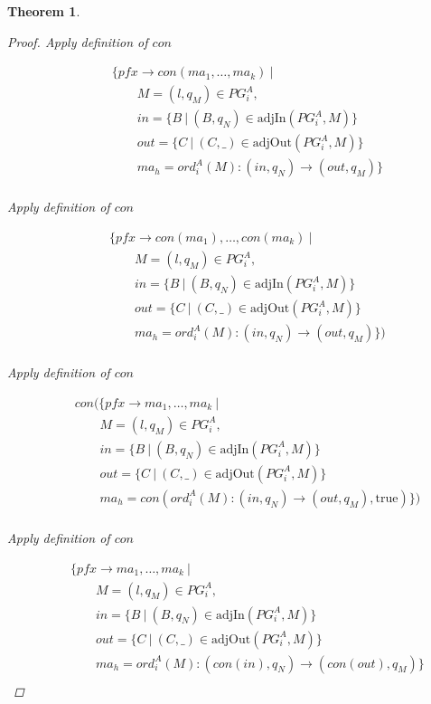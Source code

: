 \documentclass[twocolumn]{sig-alternate-10pt}
\newtheorem{thm}{Theorem}[section]
\begin{document}
\begin{thm}
\begin{proof}
  Apply definition of $con$

  \[ \begin{array}{l}
     ~~~~~~~~~ \{ pfx \rightarrow con(ma_1, \dots, ma_k) ~\vert~ \\
     ~~~~~~~~~~~~~~~~~~ M = (l,q_M) \in PG^A_i, \\
     ~~~~~~~~~~~~~~~~~~ in = \{ B ~\vert~ (B,q_N) \in \text{adjIn}(PG^A_i,M) \} \\
     ~~~~~~~~~~~~~~~~~~ out = \{ C ~\vert~ (C,\_) \in \text{adjOut}(PG^A_i,M) \} \\
     ~~~~~~~~~~~~~~~~~~ ma_h = ord^A_i(M) : (in,q_N) \rightarrow (out,q_M) \} \\
  \end{array} \]%

  Apply definition of $con$

  \[ \begin{array}{l}
     ~~~~~~~~~ \{ pfx \rightarrow con(ma_1), \dots, con(ma_k) ~\vert~ \\
     ~~~~~~~~~~~~~~~~~~ M = (l,q_M) \in PG^A_i, \\
     ~~~~~~~~~~~~~~~~~~ in = \{ B ~\vert~ (B,q_N) \in \text{adjIn}(PG^A_i,M) \} \\
     ~~~~~~~~~~~~~~~~~~ out = \{ C ~\vert~ (C,\_) \in \text{adjOut}(PG^A_i,M) \} \\
     ~~~~~~~~~~~~~~~~~~ ma_h = ord^A_i(M) : (in,q_N) \rightarrow (out,q_M) \}) \\
  \end{array} \]%

  Apply definition of $con$

  \[ \begin{array}{l}
     ~~~~~~~~~ con(\{ pfx \rightarrow ma_1, \dots, ma_k ~\vert~ \\
     ~~~~~~~~~~~~~~~~~~ M = (l,q_M) \in PG^A_i, \\
     ~~~~~~~~~~~~~~~~~~ in = \{ B ~\vert~ (B,q_N) \in \text{adjIn}(PG^A_i,M) \} \\
     ~~~~~~~~~~~~~~~~~~ out = \{ C ~\vert~ (C,\_) \in \text{adjOut}(PG^A_i,M) \} \\
     ~~~~~~~~~~~~~~~~~~ ma_h = con(ord^A_i(M) : (in,q_N) \rightarrow (out,q_M), \text{true}) \}) \\
  \end{array} \]%

  Apply definition of $con$

  \[ \begin{array}{l}
     ~~~~~~~~~ \{ pfx \rightarrow ma_1, \dots, ma_k ~\vert~ \\
     ~~~~~~~~~~~~~~~~~~ M = (l,q_M) \in PG^A_i, \\
     ~~~~~~~~~~~~~~~~~~ in = \{ B ~\vert~ (B,q_N) \in \text{adjIn}(PG^A_i,M) \} \\
     ~~~~~~~~~~~~~~~~~~ out = \{ C ~\vert~ (C,\_) \in \text{adjOut}(PG^A_i,M) \} \\
     ~~~~~~~~~~~~~~~~~~ ma_h = ord^A_i(M) : (con(in),q_N) \rightarrow (con(out),q_M) \} \\
  \end{array} \]%


\end{proof}
\end{thm}
\end{document}
